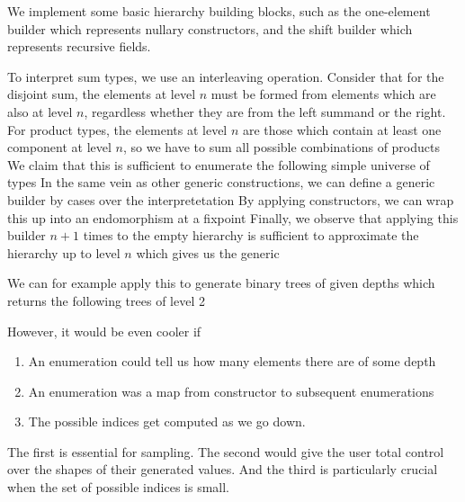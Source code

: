 We implement some basic hierarchy building blocks, such as the one-element builder
which represents nullary constructors, and the shift builder
which represents recursive fields.

To interpret sum types, we use an interleaving operation. Consider that for the disjoint sum, the elements at level $n$ must be formed from elements which are also at level $n$, regardless whether they are from the left summand or the right.
For product types, the elements at level $n$ are those which contain at least one component at level $n$, so we have to sum all possible combinations of products
We claim that this is sufficient to enumerate the following simple universe of types
In the same vein as other generic constructions, we can define a generic builder by cases over the interpretetation
By applying constructors, we can wrap this up into an endomorphism at a fixpoint
Finally, we observe that applying this builder $n+1$ times to the empty hierarchy is sufficient to approximate the hierarchy up to level $n$
which gives us the generic 

We can for example apply this to generate binary trees of given depths
which returns the following trees of level 2 


However, it would be even cooler if
\begin{enumerate}
    \item An enumeration could tell us how many elements there are of some depth
    \item An enumeration was a map from constructor to subsequent enumerations
    \item The possible indices get computed as we go down.
\end{enumerate}
The first is essential for sampling. The second would give the user total control over the shapes of their generated values. And the third is particularly crucial when the set of possible indices is small.

